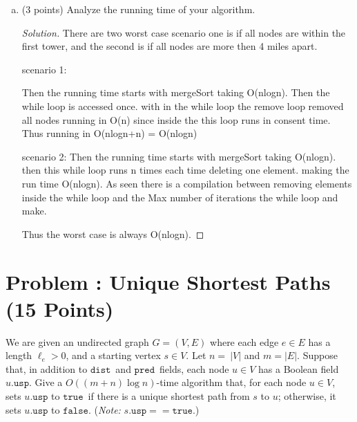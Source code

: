 \documentclass[12pt]{amsart}
\newcommand{\pred}{\ensuremath{\mathtt{pred}}}
\newcommand{\usp}{\ensuremath{\mathtt{usp}}}
\newcommand{\true}{\ensuremath{\mathtt{true}}}
\newcommand{\false}{\ensuremath{\mathtt{false}}}
\newcommand{\dist}{\ensuremath{\mathtt{dist}}}
\newcounter{pNum}
\newcommand{\problem}[2]{\addtocounter{pNum}{1}
\section*{Problem \arabic{pNum}: #1 (#2 Points)}}
\begin{document}
\begin{enumerate}[(a)]
\item (3 points)
Analyze the running time of your algorithm.
\begin{proof}[Solution]
	There are two worst case scenario one is if all nodes are within the first tower, and the second is if all nodes are more then 4 miles apart. 
	
	scenario 1:
		
		Then the running time starts with mergeSort taking O(nlogn). Then the while loop is accessed once. with in the while loop the remove loop removed all nodes running in O(n) since inside the this loop runs in consent time. Thus running in O(nlogn+n) = O(nlogn)
			
	
	scenario 2: 
		Then the running time starts with mergeSort taking O(nlogn). then this while loop runs n times each time deleting one element.  making the run time O(nlogn). As seen there is a compilation between removing elements inside the while loop and the Max number of iterations the while loop and make. 
		
		Thus the worst case is always O(nlogn). 
	
	
	
\end{proof}

\vfill
\end{enumerate}



\newpage



\problem{Unique Shortest Paths}{15}

We are given an undirected graph $G = (V, E)$ where each edge $e \in E$ has a length $\ell_e > 0$, and a starting vertex $s \in V$.  Let $n=\ |V|$ and $m = |E|$. Suppose that, in addition to \dist\ and \pred\ fields, each node $u \in V$ has a Boolean field $u.\usp$.  Give a $O((m + n) \log n)$-time algorithm that, for each node $u \in V$, sets $u.\usp$ to \true\ if there is a unique shortest path from $s$ to $u$; otherwise, it sets $u.\usp$ to \false. (\emph{Note:} $s.\usp == \true$.)
\end{document}
